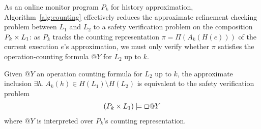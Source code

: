 As an online monitor program $P_k$ for history approximation,
Algorithm~\ref{alg:counting} effectively reduces the approximate refinement
checking problem between $L_1$ and $L_2$ to a safety verification problem on the
composition $P_k \times L_1$: as $P_k$ tracks the counting representation $\pi =
\Pi(A_k(H(e)))$ of the current execution $e$'s approximation, we must only
verify whether $\pi$ satisfies the operation-counting formula $@Y$ for $L_2$ up
to $k$.

\begin{corollary}

  Given $@Y$ an operation counting formula for $L_2$ up to $k$, the approximate
  inclusion $\exists h.\ A_k(h) \in H(L_1) \setminus H(L_2)$ is equivalent to
  the safety verification problem
  \begin{align*}
    (P_k \times L_1) |= \Box @Y
  \end{align*}
  where $@Y$ is interpreted over $P_k$'s counting representation.

\end{corollary}
